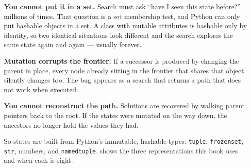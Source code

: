 \begin{alertbox}
\begin{tight}
  \item \textbf{You cannot put it in a set.} Search must ask ``have I seen this
        state before?'' millions of times. That question is a set membership test,
        and Python can only put hashable objects in a set. A class with mutable
        attributes is hashable only by identity, so two identical situations look
        different and the search explores the same state again and again ---
        usually forever.
  \item \textbf{Mutation corrupts the frontier.} If a successor is produced by
        changing the parent in place, every node already sitting in the frontier
        that shares that object silently changes too. The bug appears as a search
        that returns a path that does not work when executed.
  \item \textbf{You cannot reconstruct the path.} Solutions are recovered by
        walking parent pointers back to the root. If the states were mutated on the
        way down, the ancestors no longer hold the values they had.
\end{tight}
\end{alertbox}

So states are built from Python's immutable, hashable types:
\texttt{tuple}, \texttt{frozenset}, \texttt{str}, numbers, and
\texttt{namedtuple}.  shows the three representations this book
uses and when each is right.

